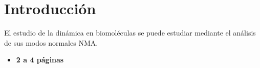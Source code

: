 \chapter*{Introducci\'{o}n}
El estudio de la din\'{a}mica en biomol\'{e}culas se puede estudiar mediante el an\'{a}lisis de sus modos normales NMA.
\begin{itemize}
\item \textbf{2 a 4 p\'{a}ginas}
\end{itemize}
